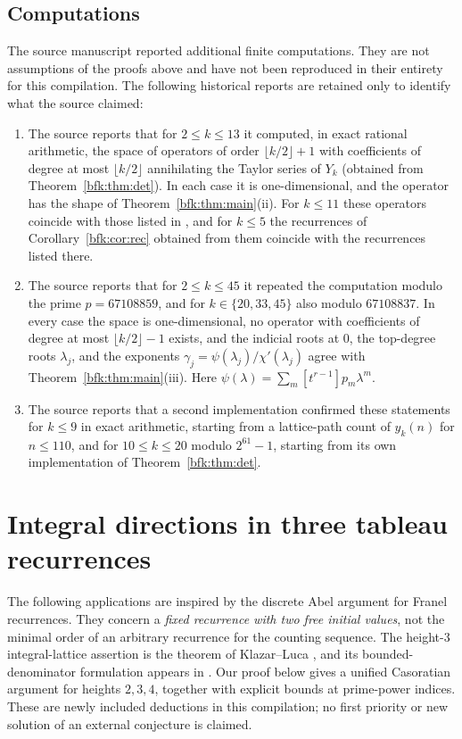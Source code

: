 \documentclass[11pt,a4paper]{article}
\theoremstyle{definition}
\theoremstyle{remark}
\numberwithin{equation}{section}
\newcommand{\fl}[1]{\lfloor #1\rfloor}
\begin{document}
\subsection*{Computations}
The source manuscript reported additional finite computations. They are not assumptions of the proofs above and have not been reproduced in their entirety for this compilation. The following historical reports are retained only to identify what the source claimed:
\begin{enumerate}
\item The source reports that for $2\le k\le13$ it computed, in exact rational arithmetic, the space of operators of order $\fl{k/2}+1$ with coefficients of degree at most $\fl{k/2}$ annihilating the Taylor series of $Y_k$ (obtained from Theorem~\ref{bfk:thm:det}). In each case it is one-dimensional, and the operator has the shape of Theorem~\ref{bfk:thm:main}(ii). For $k\le11$ these operators coincide with those listed in \cite{BG00}, and for $k\le5$ the recurrences of Corollary~\ref{bfk:cor:rec} obtained from them coincide with the recurrences listed there.
\item The source reports that for $2\le k\le45$ it repeated the computation modulo the prime $p=67108859$, and for $k\in\{20,33,45\}$ also modulo $67108837$. In every case the space is one-dimensional, no operator with coefficients of degree at most $\fl{k/2}-1$ exists, and the indicial roots at $0$, the top-degree roots $\lambda_j$, and the exponents $\gamma_j=\psi(\lambda_j)/\chi'(\lambda_j)$ agree with Theorem~\ref{bfk:thm:main}(iii). Here $\psi(\lambda)=\sum_m[t^{r-1}]p_m\lambda^m$.
\item The source reports that a second implementation confirmed these statements for $k\le9$ in exact arithmetic, starting from a lattice-path count of $y_k(n)$ for $n\le110$, and for $10\le k\le20$ modulo $2^{61}-1$, starting from its own implementation of Theorem~\ref{bfk:thm:det}.
\end{enumerate}


\section{Integral directions in three tableau recurrences}\label{bfk:sec:bfk-lattices}
The following applications are inspired by the discrete Abel argument for
Franel recurrences. They concern a \emph{fixed recurrence with two free
initial values}, not the minimal order of an arbitrary recurrence for the
counting sequence. The height-$3$ integral-lattice assertion is the theorem
of Klazar--Luca \cite{KL05}, and its bounded-denominator formulation appears
in \cite[Theorem~3.4]{Mat25}. Our proof below gives a unified Casoratian
argument for heights $2,3,4$, together with explicit bounds at prime-power
indices. These are newly included deductions in this compilation; no first
priority or new solution of an external conjecture is claimed.
\end{document}
